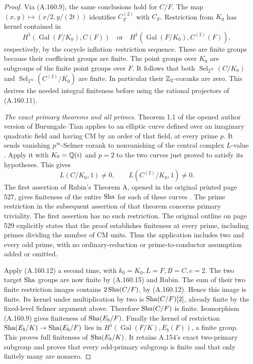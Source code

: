 \begin{proof}
Via (A.160.9), the same conclusions hold for \(C/F\).
The map \((x,y)\mapsto(x/2,y/(2t))\) identifies
\(C^{(2)}_F\) with \(C_F\).  Restriction from \(K_0\)
has kernel contained in
\[
 H^1(\operatorname{Gal}(F/K_0),C(F))
 \quad\text{or}\quad
 H^1(\operatorname{Gal}(F/K_0),C^{(2)}(F)),
\tag{A.160.14}
\]
respectively, by the cocycle inflation--restriction
sequence.  These are finite groups because their coefficient
groups are finite.  The point groups over \(K_0\) are
subgroups of the finite point groups over \(F\).
It follows that both
\(\operatorname{Sel}_{2^\infty}(C/K_0)\) and
\(\operatorname{Sel}_{2^\infty}(C^{(2)}/K_0)\) are finite.
In particular their \(\mathbb Z_2\)-coranks are zero.  This
derives the needed integral finiteness before using the
rational projectors of (A.160.11).

\emph{The exact primary theorems and all primes.}
Theorem 1.1 of the opened author version of
Burungale--Tian applies to an elliptic curve defined over
an imaginary quadratic field and having CM by an order
of that field, at every prime \(p\).  It sends vanishing
\(p^\infty\)-Selmer corank to nonvanishing of the central
complex \(L\)-value
\cite[Theorem 1.1, p.~1]{LegBurungaleTian2026}.
Apply it with \(K_0=\mathbb Q(i)\) and \(p=2\) to the two
curves just proved to satisfy its hypotheses.  This gives
\[
                  L(C/K_0,1)\ne0,
                  \qquad L(C^{(2)}/K_0,1)\ne0.
\tag{A.160.15}
\]
The first assertion of Rubin's Theorem A, opened in the
original printed page 527, gives finiteness of the entire
\(\operatorname{Sha}\) for each of these curves
\cite[Theorem A, p.~527]{LegRubin1987CM}.
The prime restriction in the subsequent assertion of that
theorem concerns primary triviality.  The first assertion
has no such restriction.  The original outline on page 529
explicitly states that the proof establishes finiteness
at every prime, including primes dividing the number of
CM units.  Thus the application includes two and every
odd prime, with no ordinary-reduction or prime-to-conductor
assumption added or omitted.

Apply (A.160.12) a second time, with
\(k_0=K_0,L=F,B=C,e=2\).  The two target \(\operatorname{Sha}\)
groups are now finite by (A.160.15) and Rubin.  The sum
of their two finite restriction images contains
\(2\operatorname{Sha}(C/F)\), by (A.160.12).  Hence this image is
finite.  Its kernel under multiplication by two is
\(\operatorname{Sha}(C/F)[2]\), already finite by the fixed-level
Selmer argument above.  Therefore \(\operatorname{Sha}(C/F)\) is
finite.  Isomorphism (A.160.9) gives finiteness of
\(\operatorname{Sha}(E_b/F)\).  Finally the kernel of restriction
\(\operatorname{Sha}(E_b/K)\to\operatorname{Sha}(E_b/F)\) lies in
\(H^1(\operatorname{Gal}(F/K),E_b(F))\), a finite
group.  This proves full finiteness of \(\operatorname{Sha}(E_b/K)\).
It retains A.154's exact two-primary subgroup and proves
that every odd-primary subgroup is finite and that only
finitely many are nonzero.


\end{proof}
